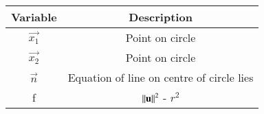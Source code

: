 \begin{tabular}[12pt]{ |c| c|}
    \hline
    \textbf{Variable} & \textbf{Description} \\ 
    \hline
    $\vec{x_1}$ & Point on circle \\
    \hline
    $\vec{x_2}$ & Point on circle \\
    \hline 
    $\vec{n}$ &  Equation of line on centre of circle lies \\
    \hline
    f & $\left\lVert\mathbf{u}\right\rVert^2$ - $r^2$ \\ 
    \hline   
    \end{tabular}
